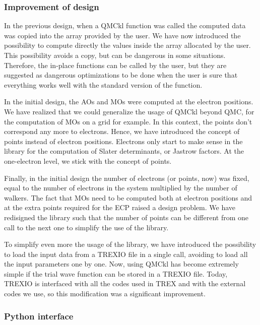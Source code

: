 \subsubsection{Improvement of design}

In the previous design, when a QMCkl function was called the computed
data was copied into the array provided by the user. We have now
introduced the possibility to compute directly the values inside the
array allocated by the user. This possibility avoids a copy, but
can be dangerous in some situations. Therefore, the in-place functions
can be called by the user, but they are suggested as dangerous
optimizations to be done when the user is sure that everything works
well with the standard version of the function.

In the initial design, the \acp{AO} and \acp{MO} were computed at the
electron positions. We have realized that we could generalize the
usage of QMCkl beyond QMC, for the computation of \acp{MO} on a grid
for example. In this context, the points don't correspond any more to
electrons.
Hence, we have introduced the concept of points instead of electron
positions. Electrons only start to make sense in the library for the
computation of Slater determinants, or Jastrow factors. At the
one-electron level, we stick with the concept of points.

Finally, in the initial design the number of electrons (or points,
now) was fixed, equal to the number of electrons in the system
multiplied by the number of walkers. The fact that \acp{MO} need to be
computed both at electron positions and at the extra points  required
for the \ac{ECP} raised a design problem. We have redisigned
the library such that the number of points can be different from one
call to the next one to simplify the use of the library.

To simplify even more the usage of the library, we have introduced the
possibility to load the input data from a TREXIO file in a single
call, avoiding to load all the input parameters one by one. Now, using
QMCkl has become extremely simple if the trial wave function can be
stored in a TREXIO file. Today, TREXIO is interfaced with all the
codes used in TREX and with the external codes we use, so this
modification was a significant improvement.

\subsubsection{Python interface}

